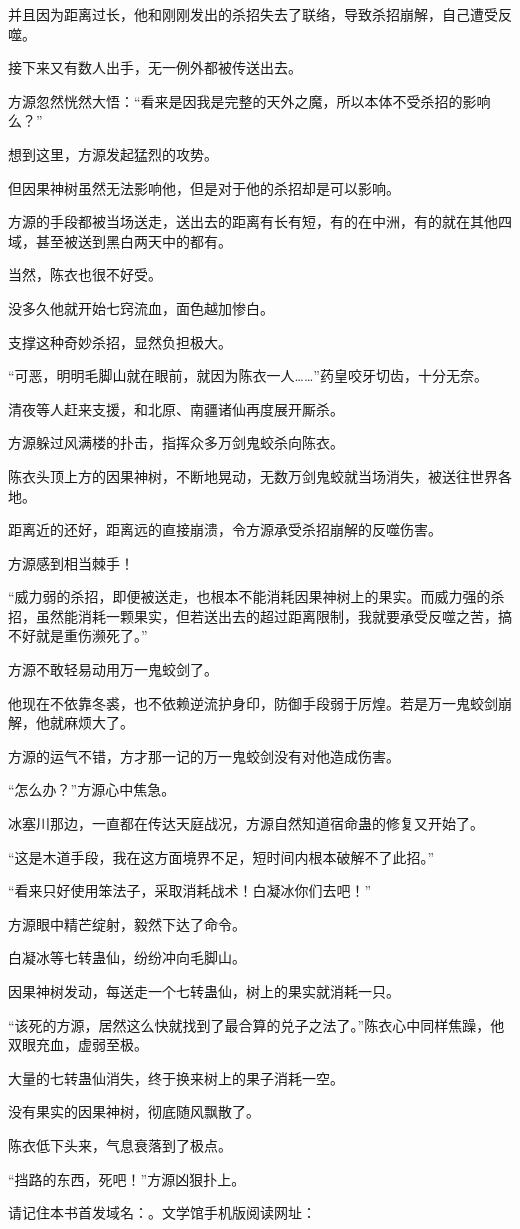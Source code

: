 \begin{this_body}
并且因为距离过长，他和刚刚发出的杀招失去了联络，导致杀招崩解，自己遭受反噬。

接下来又有数人出手，无一例外都被传送出去。

方源忽然恍然大悟：“看来是因我是完整的天外之魔，所以本体不受杀招的影响么？”

想到这里，方源发起猛烈的攻势。

但因果神树虽然无法影响他，但是对于他的杀招却是可以影响。

方源的手段都被当场送走，送出去的距离有长有短，有的在中洲，有的就在其他四域，甚至被送到黑白两天中的都有。

当然，陈衣也很不好受。

没多久他就开始七窍流血，面色越加惨白。

支撑这种奇妙杀招，显然负担极大。

“可恶，明明毛脚山就在眼前，就因为陈衣一人……”药皇咬牙切齿，十分无奈。

清夜等人赶来支援，和北原、南疆诸仙再度展开厮杀。

方源躲过风满楼的扑击，指挥众多万剑鬼蛟杀向陈衣。

陈衣头顶上方的因果神树，不断地晃动，无数万剑鬼蛟就当场消失，被送往世界各地。

距离近的还好，距离远的直接崩溃，令方源承受杀招崩解的反噬伤害。

方源感到相当棘手！

“威力弱的杀招，即便被送走，也根本不能消耗因果神树上的果实。而威力强的杀招，虽然能消耗一颗果实，但若送出去的超过距离限制，我就要承受反噬之苦，搞不好就是重伤濒死了。”

方源不敢轻易动用万一鬼蛟剑了。

他现在不依靠冬裘，也不依赖逆流护身印，防御手段弱于厉煌。若是万一鬼蛟剑崩解，他就麻烦大了。

方源的运气不错，方才那一记的万一鬼蛟剑没有对他造成伤害。

“怎么办？”方源心中焦急。

冰塞川那边，一直都在传达天庭战况，方源自然知道宿命蛊的修复又开始了。

“这是木道手段，我在这方面境界不足，短时间内根本破解不了此招。”

“看来只好使用笨法子，采取消耗战术！白凝冰你们去吧！”

方源眼中精芒绽射，毅然下达了命令。

白凝冰等七转蛊仙，纷纷冲向毛脚山。

因果神树发动，每送走一个七转蛊仙，树上的果实就消耗一只。

“该死的方源，居然这么快就找到了最合算的兑子之法了。”陈衣心中同样焦躁，他双眼充血，虚弱至极。

大量的七转蛊仙消失，终于换来树上的果子消耗一空。

没有果实的因果神树，彻底随风飘散了。

陈衣低下头来，气息衰落到了极点。

“挡路的东西，死吧！”方源凶狠扑上。

请记住本书首发域名：。文学馆手机版阅读网址：

\end{this_body}

